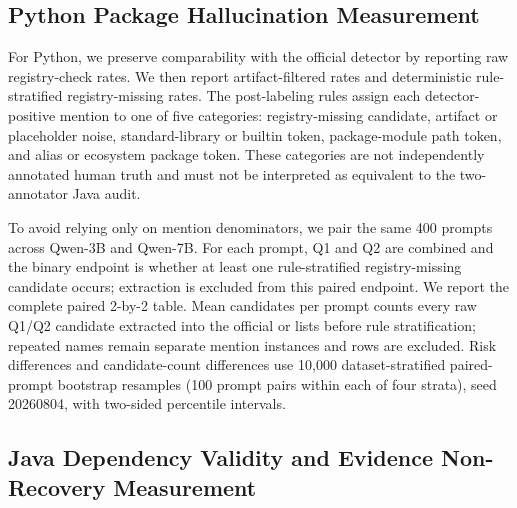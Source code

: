 \documentclass[pdflatex,sn-basic]{sn-jnl}
\newcommand{\codeid}[1]{\texttt{\detokenize{#1}}}
\begin{document}
\subsection{Python Package Hallucination Measurement}

For Python, we preserve comparability with the official detector by reporting raw registry-check rates. We then report artifact-filtered rates and deterministic rule-stratified registry-missing rates. The post-labeling rules assign each detector-positive mention to one of five categories: registry-missing candidate, artifact or placeholder noise, standard-library or builtin token, package-module path token, and alias or ecosystem package token. These categories are not independently annotated human truth and must not be interpreted as equivalent to the two-annotator Java audit.

To avoid relying only on mention denominators, we pair the same 400 prompts across Qwen-3B and Qwen-7B. For each prompt, Q1 and Q2 are combined and the binary endpoint is whether at least one rule-stratified registry-missing candidate occurs; \codeid{pip} extraction is excluded from this paired endpoint. We report the complete paired 2-by-2 table. Mean candidates per prompt counts every raw Q1/Q2 candidate extracted into the official \codeid{valid} or \codeid{hallucinated} lists before rule stratification; repeated names remain separate mention instances and \codeid{pip} rows are excluded. Risk differences and candidate-count differences use 10,000 dataset-stratified paired-prompt bootstrap resamples (100 prompt pairs within each of four strata), seed 20260804, with two-sided percentile intervals.

\subsection{Java Dependency Validity and Evidence Non-Recovery Measurement}
\end{document}
